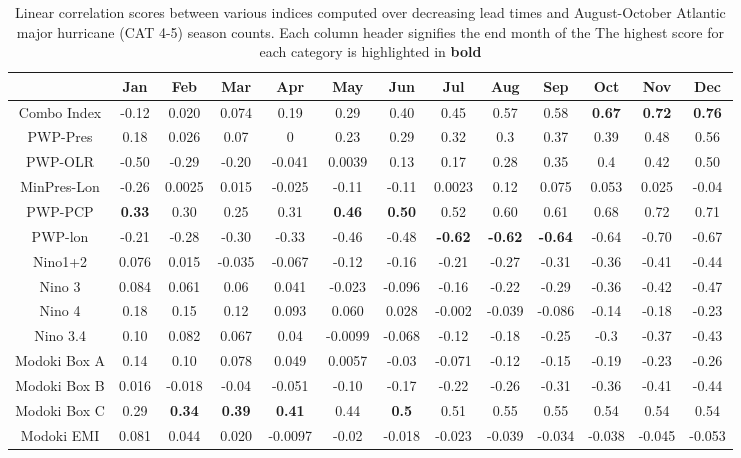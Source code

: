 \documentclass[]{article}
\begin{document}
\begin{table}
	\hspace*{-3.5cm}
\begin{tabular}{ccccccccccccc}
\hline
& Jan & Feb & Mar & Apr & May & Jun & Jul & Aug & Sep & Oct & Nov & Dec\\
\hline
Combo Index  & -0.12 & 0.020 & 0.074 & 0.19 & 0.29 & 0.40 & 0.45 & 0.57 & 0.58 & \textbf{0.67} & \textbf{0.72} & \textbf{0.76}\\
PWP-Pres & 0.18 & 0.026 & 0.07 & 0 & 0.23 & 0.29 & 0.32 & 0.3 & 0.37 & 0.39 & 0.48 & 0.56\\
PWP-OLR & -0.50 & -0.29 & -0.20 & -0.041 & 0.0039 & 0.13 & 0.17 & 0.28 & 0.35 & 0.4 & 0.42 & 0.50\\
MinPres-Lon & -0.26 & 0.0025 & 0.015 & -0.025 & -0.11 & -0.11 & 0.0023 & 0.12 & 0.075 & 0.053 & 0.025 & -0.04\\
PWP-PCP & \textbf{0.33} & 0.30 & 0.25 & 0.31 & \textbf{0.46} & \textbf{0.50} & 0.52 & 0.60 & 0.61 & 0.68 & 0.72 & 0.71\\
PWP-lon  & -0.21 & -0.28 & -0.30 & -0.33 & -0.46 & -0.48 & \textbf{-0.62} & \textbf{-0.62 }& \textbf{-0.64} & -0.64 & -0.70 & -0.67\\
Nino1+2 & 0.076 & 0.015 & -0.035 & -0.067 & -0.12 & -0.16 & -0.21 & -0.27 & -0.31 & -0.36 & -0.41 & -0.44\\
Nino 3 & 0.084 & 0.061 & 0.06 & 0.041 & -0.023 & -0.096 & -0.16 & -0.22 & -0.29 & -0.36 & -0.42 & -0.47\\
Nino 4 & 0.18 & 0.15 & 0.12 & 0.093 & 0.060 & 0.028 & -0.002 & -0.039 & -0.086 & -0.14 & -0.18 & -0.23\\
Nino 3.4 & 0.10 & 0.082 & 0.067 & 0.04 & -0.0099 & -0.068 & -0.12 & -0.18 & -0.25 & -0.3 & -0.37 & -0.43\\
Modoki Box A & 0.14 & 0.10 & 0.078 & 0.049 & 0.0057 & -0.03 & -0.071 & -0.12 & -0.15 & -0.19 & -0.23 & -0.26\\
Modoki Box B & 0.016 & -0.018 & -0.04 & -0.051 & -0.10 & -0.17 & -0.22 & -0.26 & -0.31 & -0.36 & -0.41 & -0.44\\
Modoki Box C & 0.29 & \textbf{0.34} & \textbf{0.39} & \textbf{0.41} & 0.44 & \textbf{0.5} & 0.51 & 0.55 & 0.55 & 0.54 & 0.54 & 0.54\\
Modoki EMI & 0.081 & 0.044 & 0.020 & -0.0097 & -0.02 & -0.018 & -0.023 & -0.039 & -0.034 & -0.038 & -0.045 & -0.053\\
\hline
\end{tabular}
\caption{Linear correlation scores between various indices computed over decreasing lead times and August-October Atlantic major hurricane (CAT 4-5) season counts. Each column header signifies the end month of the The highest score for each category is highlighted in \textbf{bold}}
\label{ref:lead_hurr}
\end{table}
\end{document}
